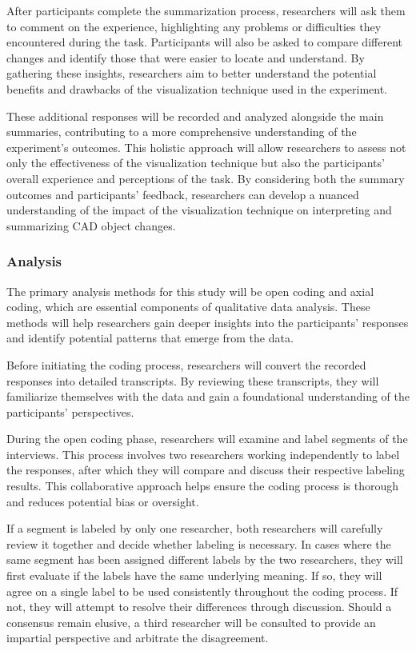 \documentclass[sigconf,authorversion,nonacm]{acmart}
\begin{document}
After participants complete the summarization process, researchers will ask them to comment on the experience, highlighting any problems or difficulties they encountered during the task. 
Participants will also be asked to compare different changes and identify those that were easier to locate and understand. 
By gathering these insights, researchers aim to better understand the potential benefits and drawbacks of the visualization technique used in the experiment.

These additional responses will be recorded and analyzed alongside the main summaries, contributing to a more comprehensive understanding of the experiment's outcomes. 
This holistic approach will allow researchers to assess not only the effectiveness of the visualization technique but also the participants' overall experience and perceptions of the task. 
By considering both the summary outcomes and participants' feedback, researchers can develop a nuanced understanding of the impact of the visualization technique on interpreting and summarizing CAD object changes.


\subsubsection{Analysis}
The primary analysis methods for this study will be open coding and axial coding, which are essential components of qualitative data analysis. These methods will help researchers gain deeper insights into the participants' responses and identify potential patterns that emerge from the data.

Before initiating the coding process, researchers will convert the recorded responses into detailed transcripts. By reviewing these transcripts, they will familiarize themselves with the data and gain a foundational understanding of the participants' perspectives.

During the open coding phase, researchers will examine and label segments of the interviews. This process involves two researchers working independently to label the responses, after which they will compare and discuss their respective labeling results.
This collaborative approach helps ensure the coding process is thorough and reduces potential bias or oversight.

If a segment is labeled by only one researcher, both researchers will carefully review it together and decide whether labeling is necessary. In cases where the same segment has been assigned different labels by the two researchers,
they will first evaluate if the labels have the same underlying meaning. If so, they will agree on a single label to be used consistently throughout the coding process.
If not, they will attempt to resolve their differences through discussion. Should a consensus remain elusive, a third researcher will be consulted to provide an impartial perspective and arbitrate the disagreement.
\end{document}

